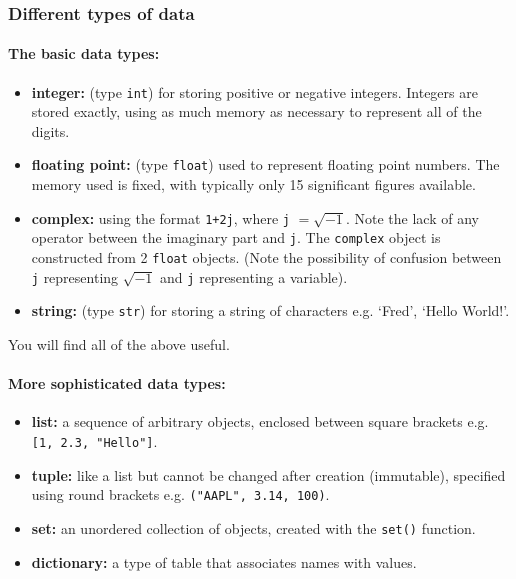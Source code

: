 \documentclass[10pt]{article}
\providecommand{\tightlist}{%
      \setlength{\itemsep}{0pt}\setlength{\parskip}{0pt}}
\begin{document}
    \hypertarget{different-types-of-data}{%
\subsubsection{Different types of
data}\label{different-types-of-data}}

\hypertarget{the-basic-data-types}{%
\paragraph{The basic data types:}\label{the-basic-data-types}}

\begin{itemize}
\tightlist
\item
  \textbf{integer:} (type \texttt{int}) for storing positive or negative
  integers. Integers are stored exactly, using as much memory as
  necessary to represent all of the digits.
\item
  \textbf{floating point:} (type \texttt{float}) used to represent
  floating point numbers. The memory used is fixed, with typically only
  15 significant figures available.
\item
  \textbf{complex:} using the format \texttt{1+2j}, where \texttt{j}
  \(=\sqrt{-1}\). Note the lack of any operator between the imaginary
  part and \texttt{j}. The \texttt{complex} object is constructed from 2
  \texttt{float} objects. (Note the possibility of confusion between
  \texttt{j} representing \(\sqrt{-1}\) and \texttt{j} representing a
  variable).
\item
  \textbf{string:} (type \texttt{str}) for storing a string of
  characters e.g. `Fred', `Hello World!'.
\end{itemize}

You will find all of the above useful.

\hypertarget{more-sophisticated-data-types}{%
\paragraph{More sophisticated data
types:}\label{more-sophisticated-data-types}}

\begin{itemize}
\tightlist
\item
  \textbf{list:} a sequence of arbitrary objects, enclosed between
  square brackets e.g. \texttt{{[}1,\ 2.3,\ "Hello"{]}}.
\item
  \textbf{tuple:} like a list but cannot be changed after creation
  (immutable), specified using round brackets e.g.
  \texttt{("AAPL",\ 3.14,\ 100)}.
\item
  \textbf{set:} an unordered collection of objects, created with the
  \texttt{set()} function.
\item
  \textbf{dictionary:} a type of table that associates names with
  values.
\end{itemize}
\end{document}
